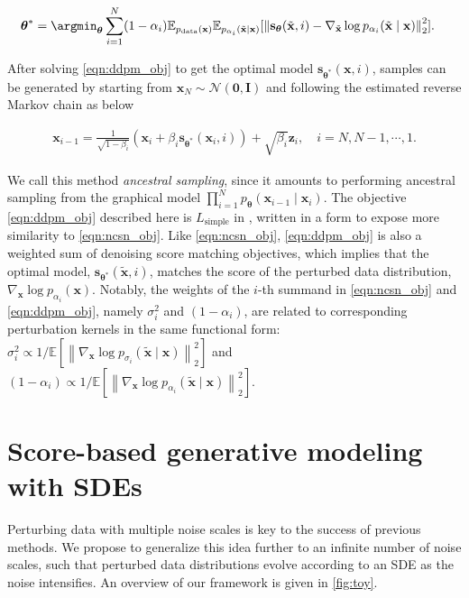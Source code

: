 \begin{align}
{\boldsymbol{\theta}}^* &= \argmin_{\boldsymbol{\theta}}
    \sum_{i=1}^{N} (1-\alpha_i) \mathbb{E}_{p_{\mathrm{data}}(\mathbf{x})}\mathbb{E}_{p_{\alpha_i}(\tilde{\mathbf{x}} \mid \mathbf{x})}[\left\lVert \mathbf{s}_{\boldsymbol{\theta}}(\tilde{\mathbf{x}}, i) - \nabla_{\tilde{\mathbf{x}}} \log p_{\alpha_i}(\tilde{\mathbf{x}} \mid \mathbf{x})\right\rVert_2^2]. \label{eqn:ddpm_obj}
\end{align}

After solving \ref{eqn:ddpm_obj} to get the optimal model $\mathbf{s}_{{\boldsymbol{\theta}}^*}(\mathbf{x}, i)$, samples can be generated by starting from $\mathbf{x}_N \sim \mathcal{N}(\mathbf{0}, \mathbf{I})$ and following the estimated reverse Markov chain as below

\begin{align}
    \mathbf{x}_{i-1} = \frac{1}{\sqrt{1-\beta_i}} (\mathbf{x}_i + \beta_i \mathbf{s}_{{\boldsymbol{\theta}}^*}(\mathbf{x}_i, i)) + \sqrt{\beta_i}\mathbf{z}_i, \quad i=N, N-1, \cdots, 1. \label{eqn:ddpm_sampling}
\end{align}

We call this method \emph{ancestral sampling}, since it amounts to performing ancestral sampling from the graphical model $\prod_{i=1}^N p_{\boldsymbol{\theta}}(\mathbf{x}_{i-1} \mid \mathbf{x}_i)$. The objective \ref{eqn:ddpm_obj} described here is $L_{\text{simple}}$ in \citet{ho2020denoising}, written in a form to expose more similarity to \ref{eqn:ncsn_obj}. 
Like \ref{eqn:ncsn_obj}, \ref{eqn:ddpm_obj} is also a weighted sum of denoising score matching objectives, which implies that the optimal model, $\mathbf{s}_{{\boldsymbol{\theta}}^*}(\tilde{\mathbf{x}}, i)$, matches the score of the perturbed data distribution, $\nabla_\mathbf{x} \log p_{\alpha_i}(\mathbf{x})$. Notably, the weights of the $i$-th summand in \ref{eqn:ncsn_obj} and \ref{eqn:ddpm_obj}, namely $\sigma_i^2$ and $(1-\alpha_i)$, are related to corresponding perturbation kernels in the same functional form: $\sigma_i^2 \propto 1/\mathbb{E}[\left\lVert\nabla_\mathbf{x} \log p_{\sigma_i}(\tilde{\mathbf{x}} \mid \mathbf{x})\right\rVert_2^2]$ and $(1-\alpha_i) \propto 1/\mathbb{E}[\left\lVert\nabla_\mathbf{x} \log p_{\alpha_i}(\tilde{\mathbf{x}} \mid \mathbf{x})\right\rVert_2^2]$. 

\section{Score-based generative modeling with SDEs} Perturbing data with multiple noise scales is key to the success of previous methods. We propose to generalize this idea further to an infinite number of noise scales, such that perturbed data distributions evolve according to an SDE as the noise intensifies. An overview of our framework is given in \ref{fig:toy}.

